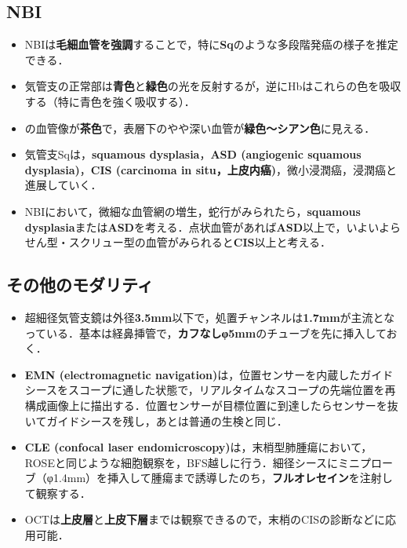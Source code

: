 \subsection{NBI}
\begin{itemize}
\item NBIは\textbf{毛細血管を強調}することで，特に\textbf{Sq}のような多段階発癌の様子を推定できる．
\item 気管支の正常部は\textbf{青色}と\textbf{緑色}の光を反射するが，逆にHbはこれらの色を吸収する（特に青色を強く吸収する）．
\item {}の血管像が\textbf{茶色}で，表層下のやや深い血管が\textbf{緑色〜シアン色}に見える．
\item 気管支Sqは，\textbf{squamous dysplasia}，\textbf{ASD (angiogenic squamous dysplasia)}，\textbf{CIS (carcinoma in situ，上皮内癌)}，微小浸潤癌，浸潤癌と進展していく．
\item NBIにおいて，微細な血管網の増生，蛇行がみられたら，\textbf{squamous dysplasia}または\textbf{ASD}を考える．点状血管があれば\textbf{ASD}以上で，いよいよらせん型・スクリュー型の血管がみられると\textbf{CIS}以上と考える．



\end{itemize}

\subsection{その他のモダリティ}

\begin{itemize}

\item 超細径気管支鏡は外径\textbf{3.5mm}以下で，処置チャンネルは\textbf{1.7mm}が主流となっている．基本は経鼻挿管で，\textbf{カフなしφ5mm}のチューブを先に挿入しておく．

\item \textbf{EMN (electromagnetic navigation)}は，位置センサーを内蔵したガイドシースをスコープに通した状態で，リアルタイムなスコープの先端位置を再構成画像上に描出する．位置センサーが目標位置に到達したらセンサーを抜いてガイドシースを残し，あとは普通の生検と同じ．
\item \textbf{CLE (confocal laser endomicroscopy)}は，末梢型肺腫瘍において，ROSEと同じような細胞観察を，BFS越しに行う．細径シースにミニプローブ（φ1.4mm）を挿入して腫瘍まで誘導したのち，\textbf{フルオレセイン}を注射して観察する．
\item OCTは\textbf{上皮層}と\textbf{上皮下層}までは観察できるので，末梢のCISの診断などに応用可能．
\end{itemize}

